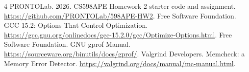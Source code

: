 \documentclass[sigplan,nonacm]{acmart}
\begin{document}
\newpage
\begin{thebibliography}{4}
 PRONTOLab. 2026. CS598APE Homework 2 starter code and assignment. \url{https://github.com/PRONTOLab/598APE-HW2}.
 Free Software Foundation. GCC 15.2: Options That Control Optimization. \url{https://gcc.gnu.org/onlinedocs/gcc-15.2.0/gcc/Optimize-Options.html}.
 Free Software Foundation. GNU gprof Manual. \url{https://sourceware.org/binutils/docs/gprof/}.
 Valgrind Developers. Memcheck: a Memory Error Detector. \url{https://valgrind.org/docs/manual/mc-manual.html}.
\end{thebibliography}
\end{document}
